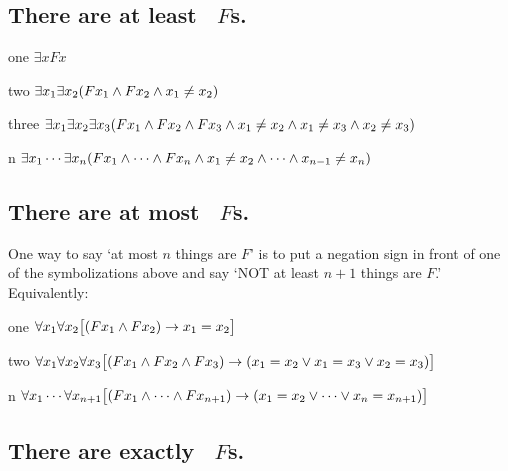\documentclass[PHIL101-Textbook.tex]{subfiles}
\begin{document}
\subsection*{There are at least \blank\ $F$s.}
\label{summary.atleast}

\begin{ekey}
\item[one] $\exists xFx$
\item[two] $\exists x_1\exists x_2(Fx_1 \land Fx_2 \land x_1 \neq x_2)$
\item[three] $\exists x_1\exists x_2\exists x_3(Fx_1 \land Fx_2 \land Fx_3 \land x_1 \neq x_2 \land x_1 \neq x_3 \land x_2 \neq x_3)$
\item[n] $\exists x_1\cdots\exists x_n(Fx_1 \land\cdots\land Fx_n \land x_1 \neq x_2 \land\cdots\land x_{n-1}\neq x_n)$ 
\end{ekey}

\subsection*{There are at most \blank\ $F$s.}
\label{summary.atmost}

One way to say `at most $n$ things are $F$' is to put a negation sign in front of one of the symbolizations above and say `NOT at least $n+1$ things are $F$.' Equivalently:
\begin{ekey}
\item[one] $\forall x_1\forall x_2\bigl[(Fx_1 \land Fx_2) \rightarrow x_1=x_2\bigr]$
\item[two] $\forall x_1\forall x_2\forall x_3\bigl[(Fx_1 \land Fx_2 \land Fx_3) \rightarrow (x_1=x_2 \vee x_1=x_3 \vee x_2=x_3)\bigr]$
\item[n]$\forall x_1\cdots\forall x_{n+1}
\bigl[(Fx_1\land \cdots \land Fx_{n+1}) \rightarrow (x_1=x_2 \vee \cdots \vee x_n=x_{n+1})\bigr]$ 
\end{ekey}

\subsection*{There are exactly \blank\ $F$s.}
\label{summary.exactly}
\end{document}

